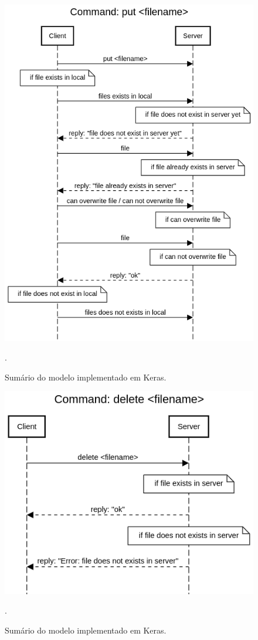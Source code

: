 \documentclass[conference]{IEEEtran}
\begin{document}
\begin{figure}[htbp]
\centering
\centerline{\includegraphics[scale=0.4]{diagrams/Command_put_filename.png}}
\caption{Sumário do modelo implementado em Keras.}.
\label{summary}
\end{figure}

\begin{figure}[htbp]
\centering
\centerline{\includegraphics[scale=0.4]{diagrams/Command_delete_filename.png}}
\caption{Sumário do modelo implementado em Keras.}.
\label{summary}
\end{figure}
\end{document}
